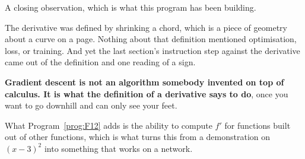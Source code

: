 \begin{fr}
A closing observation, which is what this program has been building.

The derivative was defined by shrinking a chord, which is a piece of geometry
about a curve on a page. Nothing about that definition mentioned optimisation,
loss, or training. And yet the last section's instruction \dash{} step against
the derivative \dash{} came out of the definition and one reading of a sign.

\textbf{Gradient descent is not an algorithm somebody invented on top of
calculus. It is what the definition of a derivative says to do}, once you want
to go downhill and can only see your feet.

What Program~\ref{prog:F12} adds is the ability to compute $f'$ for functions
built out of other functions, which is what turns this from a demonstration on
$(x-3)^{2}$ into something that works on a network.
\end{fr}

